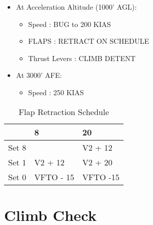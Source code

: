\begin{itemize}
\item At Acceleration Altitude (1000' AGL):

\begin{itemize}
\item Speed : BUG to 200 KIAS

\item FLAPS : RETRACT ON SCHEDULE

\item Thrust Levers : CLIMB DETENT

\end{itemize}

\item At 3000' AFE:

\begin{itemize}
\item Speed : 250 KIAS

\end{itemize}

\end{itemize}

\begin{table}[htbp]
\begin{minipage}{\linewidth}
\setlength{\tymax}{0.5\linewidth}
\centering
\small
\caption{Flap Retraction Schedule}
\label{flapretractionschedule}
\begin{tabulary}{\textwidth}{@{}lll@{}} \toprule
  &  8  & 20 \\
\midrule

 Set 8 &   & V2 + 12 \\
 Set 1 & V2 + 12 & V2 + 20 \\
 Set 0 & VFTO - 15 & VFTO -15 \\
\bottomrule

\end{tabulary}
\end{minipage}
\end{table}

\newpage

\section{Climb Check}
\label{climbcheck}

